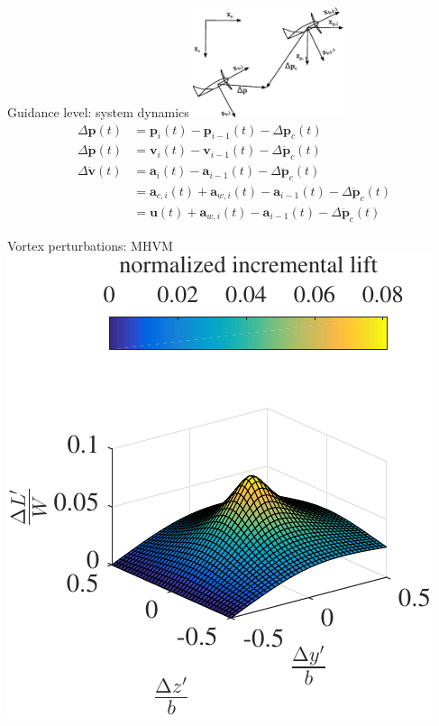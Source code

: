 \documentclass[12pt,svgnames,table,draft=false]{beamer}
\newcommand{\mbf}[1]{\mathbf{#1}}
\providecommand{\mbf}[1]{\mathbf{#1}}
\newcommand{\idxFollower}{{\ensuremath{i} }}
\newcommand{\idxPredecessor}{{\ensuremath{i-1} }}
\begin{document}
\begin{frame}{Guidance level: system dynamics}
\centering
\includegraphics[width=4.4cm]{frames.pdf}    %
\begin{align}
\Delta \mbf{p}(t) &= \mbf{p}_\idxFollower(t) - \mbf{p}_\idxPredecessor(t) - \Delta \mbf{p}_c(t)  \nonumber \\
\Delta \dot{\mbf{p}}(t) &= \mbf{v}_{\idxFollower}(t) - \mbf{v}_{\idxPredecessor}(t) -  \Delta \dot{\mbf{p}}_c(t) \nonumber \\
\Delta \dot{\mbf{v}}(t) &= \mbf{a}_\idxFollower(t) - \mbf{a}_\idxPredecessor(t) -  \Delta \ddot{\mbf{p}}_c(t) \nonumber \\
{} &= \mbf{a}_{c,\idxFollower}(t) + \mbf{a}_{w,\idxFollower}(t)
 - \mbf{a}_\idxPredecessor(t) -  \Delta \ddot{\mbf{p}}_c(t) \nonumber \\
{} &= \mbf{u}(t) + \mbf{a}_{w,\idxFollower}(t)
 - \mbf{a}_\idxPredecessor(t) -  \Delta \ddot{\mbf{p}}_c(t) \nonumber
\end{align}
\end{frame}

\begin{frame}{Vortex perturbations: MHVM \cite{dogan2005modeling}}
\centering
\includegraphics[height=.75\paperheight]{incrementallift.pdf}    %
\end{frame}
\end{document}
